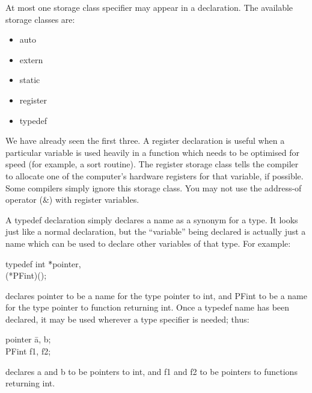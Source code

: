      At most  one {\kc storage class specifier\/}  may appear  in a 
declaration. The available storage classes are:  
 \begin{itemize}\cd
\item auto

\item extern

\item static

\item register

\item typedef
\end{itemize}
     We have  already seen  the first  three. A {\cd register}
declaration is useful when a  particular 
variable  is used  heavily
in  a function which needs to be optimised for  speed (for example, a
sort routine). The {\cd register} storage class tells the  compiler
to  allocate one  of the computer's hardware registers for that
variable,  if possible.  Some compilers simply ignore this storage
class.  You may not use the {\ms address-of} operator ({\cd \&}) with
register variables.

A {\cd typedef} 
declaration simply declares a name as a synonym
for a type. It looks just  like a  normal declaration,  but the 
``variable'' being declared is actually just  a name  which can  be
used  to declare  other variables of that type. For example:
\begin{code}
typedef int \=*pointer, \\
         \>   (*PFint)();
\end{code}
\noindent
     declares {\cd pointer}  to be  a name  for the  type {\ms pointer
to int\/}, and {\cd PFint} to be a name for  the type  {\ms pointer to
function returning int\/}. Once a {\cd typedef} name has been declared,
it may be used wherever a type specifier is needed; thus:
\begin{code}
 pointer \= a, b; \\
 PFint \> f1, f2; 
\end{code}
\noindent
     declares {\cd a}  and {\cd b}  to be {\ms pointers to int\/}, and
{\cd f1} and {\cd f2} to be {\ms pointers to functions returning
int\/}.



